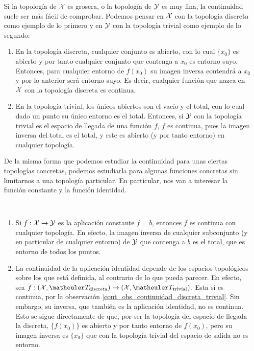 \begin{obs}
	\label{cont_obs_continuidad_discreta_trivial}
	Si la topología de $\mathcal{X}$ es grosera, o la topología de $\mathcal{Y}$ es muy fina, la continuidad suele ser más fácil de comprobar. Podemos pensar en $\mathcal{X}$ con la topología discreta como ejemplo de lo primero y en $\mathcal{Y}$ con la topología trivial como ejemplo de lo segundo:
	
	\begin{enumerate}
		\item En la topología discreta, cualquier conjunto es abierto, con lo cual $\{x_0\}$ es abierto y por tanto cualquier conjunto que contenga a $x_0$ es entorno suyo. Entonces, para cualquier entorno de $f(x_0)$ su imagen inversa contendrá a $x_0$ y por lo anterior será entorno suyo. Es decir, cualquier función que nazca en $\mathcal{X}$ con la topología discreta es continua.
		
		\item En la topología trivial, los únicos abiertos son el vacío y el total, con lo cual dado un punto su único entorno es el total. Entonces, si $\mathcal{Y}$ con la topología trivial es el espacio de llegada de una función $f$, $f$ es continua, pues la imagen inversa del total es el total, y este es abierto (y por tanto entorno) en cualquier topología. \qedhere 
	\end{enumerate}
\end{obs}

De la misma forma que podemos estudiar la continuidad para unas ciertas topologías concretas, podemos estudiarla para algunas funciones concretas sin limitarnos a una topología particular. En particular, nos van a interesar la función constante y la función identidad.

\begin{obs} \
	\label{cont_obs_continuidad_cte_e_id}
	\begin{enumerate}
		\item Si $f:\mathcal{X}\to\mathcal{Y}$ es la aplicación constante $f=b$, entonces $f$ es continua con cualquier topología. En efecto, la imagen inversa de cualquier subconjunto (y en particular de cualquier entorno) de $\mathcal{Y}$ que contenga a $b$ es el total, que es entorno de todos los puntos.
		
		\item La continuidad de la aplicación identidad depende de los espacios topológicos sobre los que está definida, al contrario de lo que pueda parecer. En efecto, sea $f:(\X,\T_\text{discreta})\to (\X,\T_\text{trivial})$. Esta sí es continua, por la observación \ref{cont_obs_continuidad_discreta_trivial}. Sin embargo, su inversa, que también es la aplicación identidad, no es continua. Esto se sigue directamente de que, por ser la topología del espacio de llegada la discreta, $\{f(x_0)\}$ es abierto y por tanto entorno de $f(x_0)$, pero su imagen inversa es $\{x_0\}$ que con la topología trivial del espacio de salida no es entorno. \qedhere
	\end{enumerate}
\end{obs}

